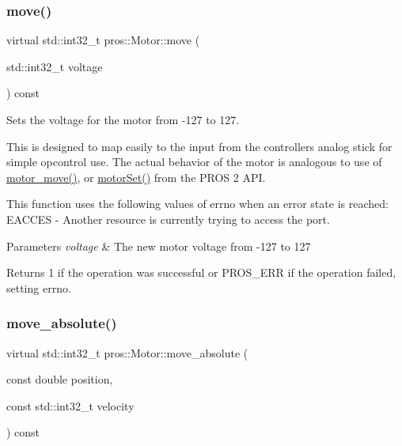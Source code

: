 \subsubsection{\texorpdfstring{move()}{move()}}
{\footnotesize\ttfamily virtual std\+::int32\+\_\+t pros\+::\+Motor\+::move (\begin{DoxyParamCaption}\item[{std\+::int32\+\_\+t}]{voltage }\end{DoxyParamCaption}) const\hspace{0.3cm}{\ttfamily [virtual]}}



Sets the voltage for the motor from -\/127 to 127. 

This is designed to map easily to the input from the controller\textquotesingle{}s analog stick for simple opcontrol use. The actual behavior of the motor is analogous to use of \mbox{\hyperlink{motors_8h_a7da9bf1e229e50bfeeaecf026a6d0d08}{motor\+\_\+move()}}, or \mbox{\hyperlink{api__legacy_8h_a59a0d6bd050cd259ad488e68f856ae81}{motor\+Set()}} from the P\+R\+OS 2 A\+PI.

This function uses the following values of errno when an error state is reached\+: E\+A\+C\+C\+ES -\/ Another resource is currently trying to access the port.


\begin{DoxyParams}{Parameters}
{\em voltage} & The new motor voltage from -\/127 to 127\\
\hline
\end{DoxyParams}
\begin{DoxyReturn}{Returns}
1 if the operation was successful or P\+R\+O\+S\+\_\+\+E\+RR if the operation failed, setting errno. 
\end{DoxyReturn}
\mbox{\label{classpros_1_1Motor_a7851ffa40c9803d75398a5be355de395}} 
\subsubsection{\texorpdfstring{move\_absolute()}{move\_absolute()}}
{\footnotesize\ttfamily virtual std\+::int32\+\_\+t pros\+::\+Motor\+::move\+\_\+absolute (\begin{DoxyParamCaption}\item[{const double}]{position,  }\item[{const std\+::int32\+\_\+t}]{velocity }\end{DoxyParamCaption}) const\hspace{0.3cm}{\ttfamily [virtual]}}



